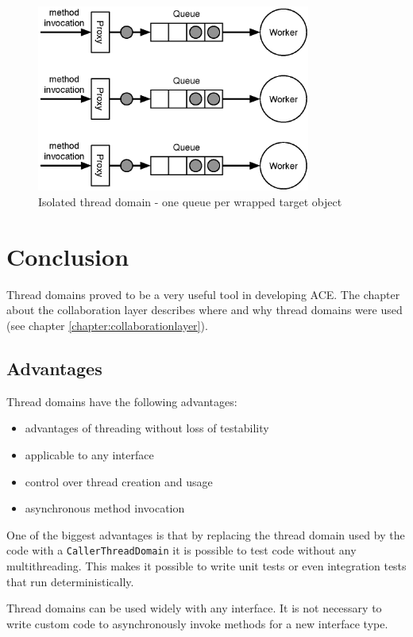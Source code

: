 \begin{figure}[htb]
 \centering
 \includegraphics[width=9cm,height=6.15cm]{../images/finalreport/threaddomain_isolated.eps}
 \caption{Isolated thread domain - one queue per wrapped target object}
 \label{fig:threaddomain.isolated}
\end{figure}



\section{Conclusion}

Thread domains proved to be a very useful tool in developing ACE. The
chapter about the collaboration layer describes where and why thread
domains were used (see chapter \ref{chapter:collaborationlayer}).


\subsection{Advantages}
Thread domains have the following advantages:

\begin{itemize}
 \item advantages of threading without loss of testability
 \item applicable to any interface
 \item control over thread creation and usage
 \item asynchronous method invocation
\end{itemize}

One of the biggest advantages is that by replacing the thread domain used
by the code with
a \texttt{CallerThreadDomain} it is possible to test code without any
multithreading. This makes it possible to write unit tests or even 
integration tests that run deterministically.

Thread domains can be used widely with any interface. It is not necessary to
write custom code to asynchronously invoke methods for a new interface type.

